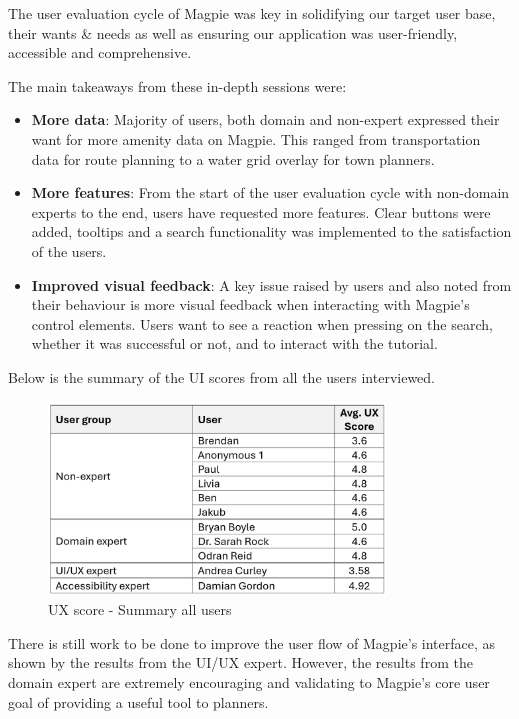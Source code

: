 The user evaluation cycle of Magpie was key in solidifying our target user base,
their wants \& needs as well as ensuring our application was user-friendly,
accessible and comprehensive.

The main takeaways from these in-depth sessions were:
\begin{itemize}
      \item \textbf{More data}: Majority of users, both domain and non-expert
            expressed their want for more amenity data on Magpie. This ranged from
            transportation data for route planning to a water grid overlay for town
            planners.
            
      \item \textbf{More features}: From the start of the user evaluation cycle
            with non-domain experts to the end, users have requested more features.
            Clear buttons were added, tooltips and a search functionality was
            implemented to the satisfaction of the users.
            
      \item \textbf{Improved visual feedback}: A key issue raised by users and
            also noted from their behaviour is more visual feedback when interacting
            with Magpie's control elements. Users want to see a reaction when pressing
            on the search, whether it was successful or not, and to interact with the tutorial.
\end{itemize}

Below is the summary of the UI scores from all the users interviewed.

\begin{figure}[htbp]
      \centering
      \includegraphics[width=0.8\textwidth]{images/ux-score-summary.png}
      \caption{UX score - Summary all users}
\end{figure}

There is still work to be done to improve the user flow of Magpie's interface,
as shown by the results from the UI/UX expert. However, the results from the
domain expert are extremely encouraging and validating to Magpie's core user goal of
providing a useful tool to planners.

\newpage{}